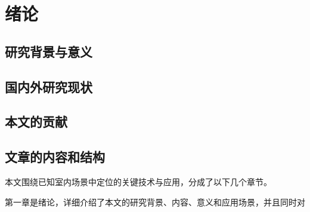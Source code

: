 \chapter{绪论}
\section{研究背景与意义}

\section{国内外研究现状}
\section{本文的贡献}
\section{文章的内容和结构}
本文围绕已知室内场景中定位的关键技术与应用，分成了以下几个章节。

第一章是绪论，详细介绍了本文的研究背景、内容、意义和应用场景，并且同时对